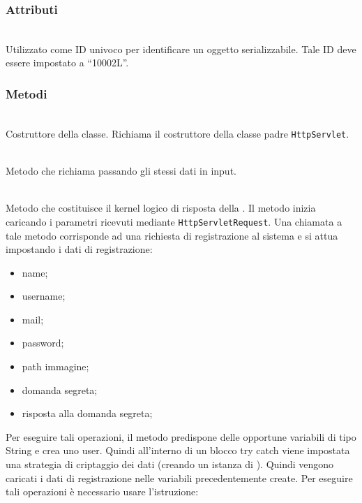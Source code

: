\subsubsection*{Attributi}
\begin{description}
  \item{}\\
  Utilizzato come ID univoco per identificare un oggetto serializzabile. Tale ID deve essere impostato a ``10002L''.
\end{description}

\subsubsection*{Metodi}
\begin{description}
	\item{}\\
	Costruttore della classe. Richiama il costruttore della classe padre \texttt{HttpServlet}.
	
	\item{}\\
	Metodo che richiama  passando gli stessi dati in input.
	
	\item{}\\

Metodo che costituisce il kernel logico di risposta della . Il metodo inizia caricando i parametri ricevuti mediante \texttt{HttpServletRequest}. Una chiamata a tale metodo corrisponde ad una richiesta di registrazione al sistema e si attua impostando i dati di registrazione:
	\begin{itemize}
		\item name;
		\item username;
		\item mail;
		\item password;
		\item path immagine;
		\item domanda segreta;
		\item risposta alla domanda segreta;
	\end{itemize}
	Per eseguire tali operazioni, il metodo predispone delle opportune variabili di tipo String e crea uno  user. Quindi all'interno di un blocco try catch viene impostata una strategia di criptaggio dei dati (creando un istanza di ). Quindi vengono caricati i dati di registrazione nelle variabili precedentemente create. Per eseguire tali operazioni è necessario usare l'istruzione:\\
	

\end{description}
